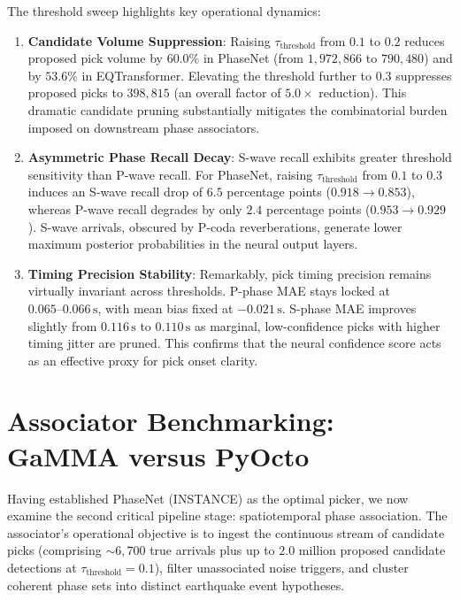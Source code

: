 The threshold sweep highlights key operational dynamics:
\begin{enumerate}
  \item \textbf{Candidate Volume Suppression}: Raising $\tau_{\mathrm{threshold}}$ from $0.1$ to $0.2$ reduces proposed pick volume by $60.0\%$ in PhaseNet (from $1{,}972{,}866$ to $790{,}480$) and by $53.6\%$ in EQTransformer. Elevating the threshold further to $0.3$ suppresses proposed picks to $398{,}815$ (an overall factor of $5.0\times$ reduction). This dramatic candidate pruning substantially mitigates the combinatorial burden imposed on downstream phase associators.
  \item \textbf{Asymmetric Phase Recall Decay}: S-wave recall exhibits greater threshold sensitivity than P-wave recall. For PhaseNet, raising $\tau_{\mathrm{threshold}}$ from $0.1$ to $0.3$ induces an S-wave recall drop of $6.5$ percentage points ($0.918 \to 0.853$), whereas P-wave recall degrades by only $2.4$ percentage points ($0.953 \to 0.929$). S-wave arrivals, obscured by P-coda reverberations, generate lower maximum posterior probabilities in the neural output layers.
  \item \textbf{Timing Precision Stability}: Remarkably, pick timing precision remains virtually invariant across thresholds. P-phase MAE stays locked at $0.065\text{--}0.066\,\unit{\second}$, with mean bias fixed at $-0.021\,\unit{\second}$. S-phase MAE improves slightly from $0.116\,\unit{\second}$ to $0.110\,\unit{\second}$ as marginal, low-confidence picks with higher timing jitter are pruned. This confirms that the neural confidence score acts as an effective proxy for pick onset clarity.
\end{enumerate}

\section{Associator Benchmarking: GaMMA versus PyOcto}
\label{sec:associator_benchmarking}

Having established PhaseNet (INSTANCE) as the optimal picker, we now examine the second critical pipeline stage: spatiotemporal phase association. The associator's operational objective is to ingest the continuous stream of candidate picks (comprising $\sim 6{,}700$ true arrivals plus up to $2.0$ million proposed candidate detections at $\tau_{\mathrm{threshold}} = 0.1$), filter unassociated noise triggers, and cluster coherent phase sets into distinct earthquake event hypotheses.


